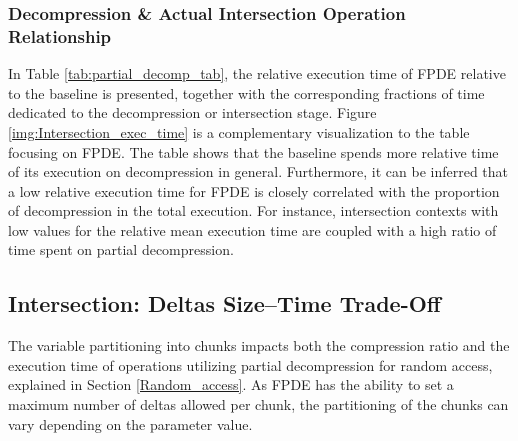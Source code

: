 \subsubsection{Decompression \& Actual Intersection Operation Relationship}
In Table \ref{tab:partial_decomp_tab}, the relative execution time of FPDE relative to the baseline is presented, together with the corresponding fractions of time dedicated to the decompression or intersection stage. Figure \ref{img:Intersection_exec_time} is a complementary visualization to the table focusing on FPDE. The table shows that the baseline spends more relative time of its execution on decompression in general. Furthermore, it can be inferred that a low relative execution time for FPDE is closely correlated with the proportion of decompression in the total execution. For instance, intersection contexts with low values for the relative mean execution time are coupled with a high ratio of time spent on partial decompression.





\newpage
\label{sec:res_intersection}
\subsection{Intersection: Deltas Size–Time Trade-Off}
\label{sec:chunking}
The variable partitioning into chunks impacts both the compression ratio and the execution time of operations utilizing partial decompression for random access, explained in Section \ref{Random_access}. 
As FPDE has the ability to set a maximum number of deltas allowed per chunk, the partitioning of the chunks can vary depending on the parameter value. 

